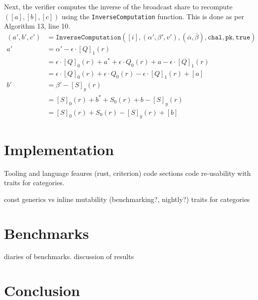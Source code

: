 \documentclass[twoside,11pt,openright]{report}
\begin{document}
Next, the verifier computes the inverse of the broadcast share to recompute $([a], [b], [c])$ using the \texttt{InverseComputation} function. This is done as per Algorithm 13, line 10.
\begin{align*}
  (a', b', c') & = \texttt{InverseComputation}([i], (\alpha', \beta', v'),
  (\overline{\alpha}, \overline{\beta}), \texttt{chal}, \texttt{pk}, \texttt{true})                        \\
  a'           & = \alpha' - \epsilon \cdot {[Q]}_1(r)                                                     \\
               & = \epsilon \cdot {[Q]}_0(r) + a^* + \epsilon \cdot Q_0(r) + a - \epsilon \cdot {[Q]}_1(r) \\
               & = \epsilon \cdot {[Q]}_0(r) + \epsilon \cdot Q_0(r) - \epsilon \cdot {[Q]}_1(r)   + [a]   \\
  b'           & = \beta' - {[S]}_y(r)                                                                     \\
               & = {[S]}_0(r) + b^* + S_0(r)  + b - {[S]}_y(r)                                             \\
               & = {[S]}_0(r) + S_0(r) - {[S]}_y(r) + [b]
\end{align*}


\chapter{Implementation}
\label{ch:impl}

Tooling and language feaures (rust, criterion)
code sections
code re-usability with traits for categories.

const generics vs inline mutability (benchmarking?, nightly?)
traits for categories


\chapter{Benchmarks}
\label{ch:bench}
diaries of benchmarks.
discussion of results

\lipsum[1-20] %


\chapter{Conclusion}
\label{ch:conclusion}
\end{document}
